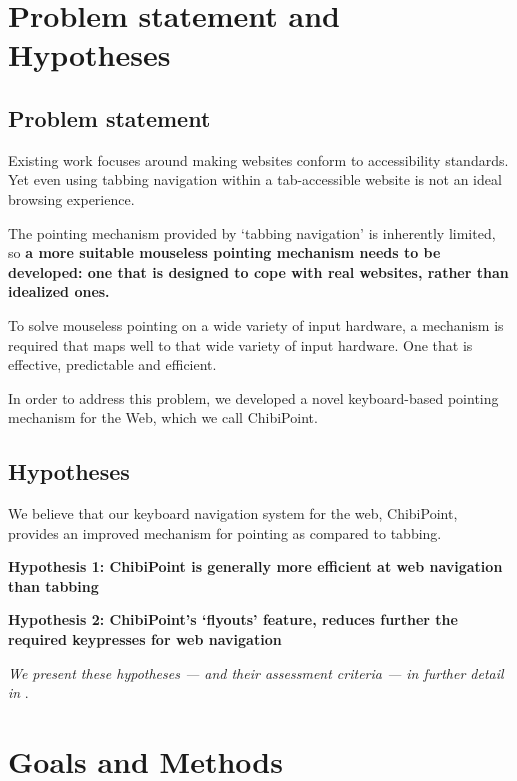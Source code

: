 \documentclass[11pt,openright,a4paper]{report}
\begin{document}
\section{Problem statement and Hypotheses}
\subsection{Problem statement}
Existing work focuses around making websites conform to accessibility standards. Yet even using tabbing navigation within a tab-accessible website is not an ideal browsing experience.

The pointing mechanism provided by `tabbing navigation' is inherently limited, so \textbf{a more suitable mouseless pointing mechanism needs to be developed: one that is designed to cope with real websites, rather than idealized ones.}

To solve mouseless pointing on a wide variety of input hardware, a mechanism is required that maps well to that wide variety of input hardware. One that is effective, predictable and efficient.

In order to address this problem, we developed a novel keyboard-based pointing mechanism for the Web, which we call ChibiPoint.

\subsection{Hypotheses}
\label{chap:hypotheses}
We believe that our keyboard navigation system for the web, ChibiPoint, provides an improved mechanism for pointing as compared to tabbing.

\newcommand{\hypone}{Hypothesis 1: ChibiPoint is generally more efficient at web navigation than tabbing}
\textbf{\hypone}

\newcommand{\hyptwo}{Hypothesis 2: ChibiPoint's `flyouts' feature, reduces further the required keypresses for web navigation}
\textbf{\hyptwo}

\textit{We present these hypotheses --- and their assessment criteria --- in further detail in }.
\section{Goals and Methods}
\end{document}

